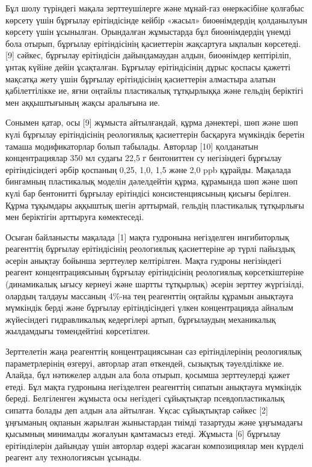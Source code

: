 \begin{multicols}{2}
Бұл шолу түріндегі мақала зерттеушілерге және мұнай-газ өнеркәсібіне
қолғабыс көрсету үшін бұрғылау ерітіндісінде кейбір «жасыл»
биоөнімдердің қолданылуын көрсету үшін ұсынылған. Орындалған жұмыстарда
бұл биоөнімдердің үнемді бола отырып, бұрғылау ерітіндісінің қасиеттерін
жақсартуға ықпалын көрсетеді. {[}9{]} сәйкес, бұрғылау ерітіндісін
дайындамаудан алдын, биоөнімдер кептіріліп, ұнтақ күйіне дейін
ұсақталған. Бұрғылау ерітіндісінің дұрыс қоспасы қажетті мақсатқа жету
үшін бұрғылау ерітіндісінің қасиеттерін алмастыра алатын қабілеттілікке
ие, яғни оңтайлы пластикалық тұтқырлыққа және гельдің беріктігі мен
аққыштығының жақсы аралығына ие.

Сонымен қатар, осы {[}9{]} жұмыста айтылғандай, құрма дәнектері, шөп
және шөп күлі бұрғылау ерітіндісінің реологиялық қасиеттерін басқаруға
мүмкіндік беретін тамаша модификаторлар болып табылады. Авторлар
{[}10{]} қолданатын концентрациялар 350 мл судағы 22,5 г бентониттен су
негізіндегі бұрғылау ерітіндісіндегі әрбір қоспаның 0,25, 1,0, 1,5 және
2,0 ppb құрайды. Мақалада бингамның пластикалық моделін дәлелдейтін
құрма, құрамында шөп және шөп күлі бар бентонитті бұрғылау ерітіндісі
консистенциясының қисығы берілген. Құрма тұқымдары аққыштық шегін
арттырмай, гельдің пластикалық тұтқырлығы мен беріктігін арттыруға
көмектеседі.

Осыған байланысты мақалада {[}1{]} мақта гудронына негізделген
ингибиторлық реагенттің бұрғылау ерітіндісінің реологиялық қасиеттеріне
әр түрлі пайыздық әсерін анықтау бойынша зерттеулер келтірілген. Мақта
гудроны негізіндегі реагент концентрациясының бұрғылау ерітіндісінің
реологиялық көрсеткіштеріне (динамикалық ығысу кернеуі және шартты
тұтқырлық) әсерін зерттеу жүргізілді, олардың талдауы массаның 4\%-на
тең реагенттің оңтайлы құрамын анықтауға мүмкіндік берді және бұрғылау
ерітіндісіндегі үлкен концентрацияда айналым жүйесіндегі гидравликалық
кедергілері артып, бұрғылаудың механикалық жылдамдығы төмендейтіні
көрсетілген.

Зерттелетін жаңа реагенттің концентрациясынан саз ерітінділерінің
реологиялық параметрлерінің өзгеруі, авторлар атап өткендей, сызықтық
тәуелділікке ие. Алайда, бұл нәтижелер алдын ала бола отырып, қосымша
зерттеулерді қажет етеді. Бұл мақта гудронына негізделген реагенттің
сипатын анықтауға мүмкіндік береді. Белгіленген жұмыста осы негіздегі
сұйықтықтар псевдопластикалық сипатта болады деп алдын ала айтылған.
Ұқсас сұйықтықтар сәйкес {[}2{]} ұңғыманың оқпанын жарылған жыныстардан
тиімді тазартуды және ұңғымадағы қысымның минималды жоғалуын қамтамасыз
етеді. Жұмыста {[}6{]} бұрғылау ерітінділерін дайындау үшін авторлар
өздері жасаған композициялар мен күрделі реагент алу технологиясын
ұсынады.


\end{multicols}
